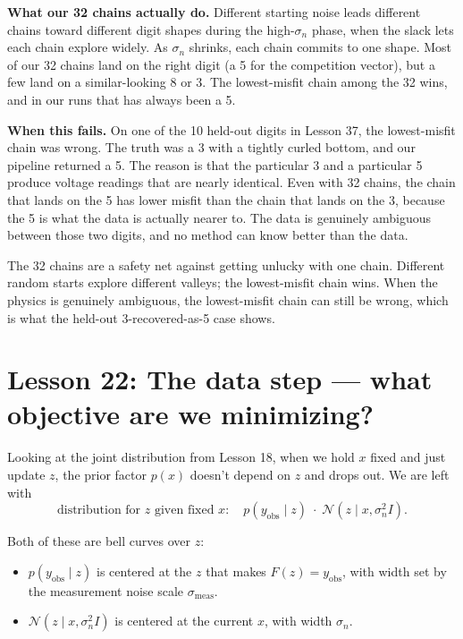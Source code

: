 \documentclass[11pt]{article}
\begin{document}
\textbf{What our 32 chains actually do.} Different starting noise leads
different chains toward different digit shapes during the
high-$\sigma_n$ phase, when the slack lets each chain explore widely.
As $\sigma_n$ shrinks, each chain commits to one shape. Most of our 32
chains land on the right digit (a 5 for the competition vector), but a
few land on a similar-looking 8 or 3. The lowest-misfit chain among the
32 wins, and in our runs that has always been a 5.

\textbf{When this fails.} On one of the 10 held-out digits in Lesson
37, the lowest-misfit chain was wrong. The truth was a 3 with a
tightly curled bottom, and our pipeline returned a 5. The reason is
that the particular 3 and a particular 5 produce voltage readings that
are nearly identical. Even with 32 chains, the chain that lands on the
5 has lower misfit than the chain that lands on the 3, because the 5
is what the data is actually nearer to. The data is genuinely
ambiguous between those two digits, and no method can know better than
the data.

\begin{key}
The 32 chains are a safety net against getting unlucky with one chain.
Different random starts explore different valleys; the lowest-misfit
chain wins. When the physics is genuinely ambiguous, the lowest-misfit
chain can still be wrong, which is what the held-out 3-recovered-as-5
case shows.
\end{key}

\section{Lesson 22: The data step --- what objective are we minimizing?}

Looking at the joint distribution from Lesson 18, when we hold $x$
fixed and just update $z$, the prior factor $p(x)$ doesn't depend on $z$
and drops out. We are left with
\[
\text{distribution for }z\text{ given fixed }x:\quad
p(y_{\text{obs}} \mid z) \;\cdot\; \mathcal{N}(z \mid x, \sigma_n^2 I).
\]

Both of these are bell curves over $z$:
\begin{itemize}[leftmargin=2em]
\item $p(y_{\text{obs}} \mid z)$ is centered at the $z$ that makes
  $F(z) = y_{\text{obs}}$, with width set by the measurement noise
  scale $\sigma_{\text{meas}}$.
\item $\mathcal{N}(z \mid x, \sigma_n^2 I)$ is centered at the current
  $x$, with width $\sigma_n$.
\end{itemize}
\end{document}
